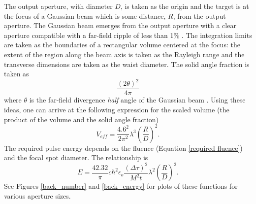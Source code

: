 The output aperture, with diameter $D$, is taken as the origin and the target is at the focus of a Gaussian beam which is some distance, $R$, from the output aperture. The Gaussian beam emerges from the output aperture with a clear aperture compatible with a far-field ripple of less than 1\% \cite{Siegman:1986a}. The integration limits are taken as the boundaries of a rectangular volume centered at the focus: the extent of the region along the beam axis is taken as the Rayleigh range and the transverse dimensions are taken as the waist diameter. The solid angle fraction is taken as
\begin{equation}
\frac{(2\theta)^2}{4\pi}
\end{equation}
where $\theta$ is the far-field divergence \emph{half} angle of the Gaussian beam \cite{Siegman:1986a}. Using these ideas, one can arrive at the following expression for the scaled volume (the product of the volume and the solid angle fraction)
\begin{equation}
\boxed{
V_{eff}
=
\frac{4.6^2}{2 \pi^2}
\lambda^3
\left(\frac{R}{D}\right)^2.
\label{v_eff}
}
\end{equation}
The required pulse energy depends on the fluence (Equation \ref{required fluence}) and the focal spot diameter. The relationship is
\begin{equation}
\boxed{
E
=
\frac{42.32}{\pi}
c \hbar^2 \epsilon_o
\frac{(\Delta\tau)^2}{M^2 t}
\lambda^2
\left(\frac{R}{D}\right)^2.
\label{energy_required}
}
\end{equation}
See Figures \ref{back_number} and \ref{back_energy} for plots of these functions for various aperture sizes.



